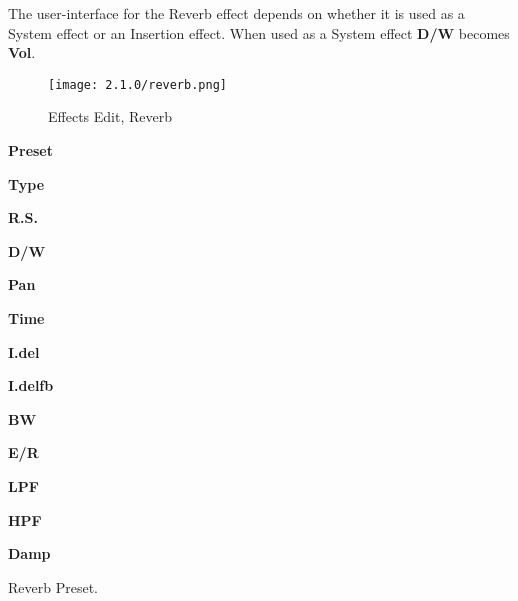    The user-interface for the Reverb effect depends on whether it is used as a
   System effect or an Insertion effect. When used as a System effect \textbf{D/W} becomes \textbf{Vol}.
\iffalse
   Observr \figureref{fig:effects_edit_reverb}, where
   the Insertion mode is shown.  In the System mode, only the light-blue
   portion of the user-interface appears.
\fi
\begin{figure}[H]
   \centering
   \texttt{[image: 2.1.0/reverb.png]}
   \caption{Effects Edit, Reverb}
   \label{fig:effects_edit_reverb}
\end{figure}

   \begin{enumber}
      \item \textbf{Preset}
      \item \textbf{Type}
      \item \textbf{R.S.}
      \item \textbf{D/W}
      \item \textbf{Pan}
      \item \textbf{Time}
      \item \textbf{I.del}
      \item \textbf{I.delfb}
      \item \textbf{BW}
      \item \textbf{E/R}
      \item \textbf{LPF}
      \item \textbf{HPF}
      \item \textbf{Damp}
   \end{enumber}
\iffalse
???
  There is a fourth type we have screen captures for, but we can't seem
  to navigate to them now!  Are these now out-of-date screen captures?
This belongs elsewhere
   \begin{enumber}
      \item \textbf{FX No.}
      \item \textbf{bypass}
      \item \textbf{EffType}
      \item \textbf{Send To}
      \item \textbf{C}
      \item \textbf{P}
      \item \textbf{Close}
   \end{enumber}
\fi
   \setcounter{ItemCounter}{0}      %

      Reverb Preset.

